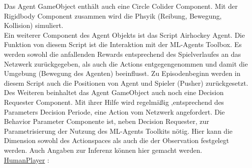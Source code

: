 Das Agent GameObject enthält auch eine Circle Colider Component. Mit der Rigidbody Component zusammen wird die Phsyik (Reibung, Bewegung, Kollision) simuliert.\\
Ein weiterer Component des Agent Objekts ist das Script Airhockey Agent. Die Funktion von diesem Script ist die Interaktion mit der ML-Agents Toolbox. Es werden sowohl die anfallenden Rewards entsprechend des Spielverlaufes an das Netzwerk zurückgegeben, als auch die Actions entgegengenommen und damit die Umgebung (Bewegung des Agenten) beeinflusst. Zu Episodenbeginn werden in diesem Script auch die Positionen von Agent und Spieler (Pusher) zurückgesetzt. \\
Des Weiteren beinhaltet das Agent GameObject auch noch eine Decision Requester Component. Mit ihrer Hilfe wird regelmäßig ,entsprechend des Parameters Decision Periode, eine Action vom Netzwerk angefordert. Die Behavior Parameter Componente ist, neben Decision Requester, zur Parametrisierung der Nutzung des ML-Agents Toolkits nötig. Hier kann die Dimension sowohl des Actionspaces als auch die der Observation festgelegt werden. Auch Angaben zur Inferenz können hier gemacht werden. \\


\underline{HumanPlayer} :

